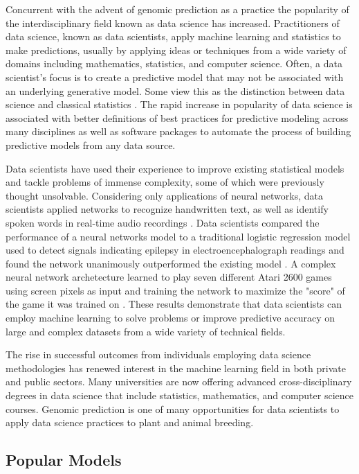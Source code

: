 Concurrent with the advent of genomic prediction as a practice the popularity of the 
interdisciplinary field known as data science has increased. Practitioners of data 
science, known as data scientists, apply machine learning and statistics to make 
predictions, usually by applying ideas or techniques from a wide variety of domains 
including mathematics, statistics, and computer science. Often, a data scientist's focus is to
create a predictive model that may not be associated with an underlying generative model. 
Some view this as the distinction between data science and classical statistics 
\citep{donoho2015, breiman2001}. The rapid increase in popularity of data science
is associated with better definitions of best practices for predictive modeling
across many disciplines as well as software packages to automate the 
process of building predictive models from any data source.

Data scientists have used their experience to improve existing statistical 
models and tackle problems of immense complexity, some of which were previously 
thought unsolvable. Considering only applications of neural networks, data scientists
applied networks to recognize handwritten text, as well as identify spoken 
words in real-time audio recordings \citep{lang1990}.
Data scientists compared the performance of a neural networks model to a traditional 
logistic regression model used to detect signals indicating epilepsy in electroencephalograph 
readings and found the network unanimously outperformed the existing model \citep{subasi2005}.
A complex neural network archetecture learned to play seven different Atari 2600 
games using screen pixels as input and training the network to maximize the "score" of
the game it was trained on \citep{mnih2013}. These results demonstrate that data scientists
can employ machine learning to solve problems or improve predictive accuracy on large and 
complex datasets from a wide variety of technical fields.

The rise in successful outcomes from individuals employing data science
methodologies has renewed interest in the machine learning field in both
private and public sectors. Many universities are now offering advanced cross-disciplinary
degrees in data science that include statistics, mathematics, and computer
science courses. Genomic prediction is one of many opportunities for data scientists
to apply data science practices to plant and animal breeding.

\subsection{Popular Models}

